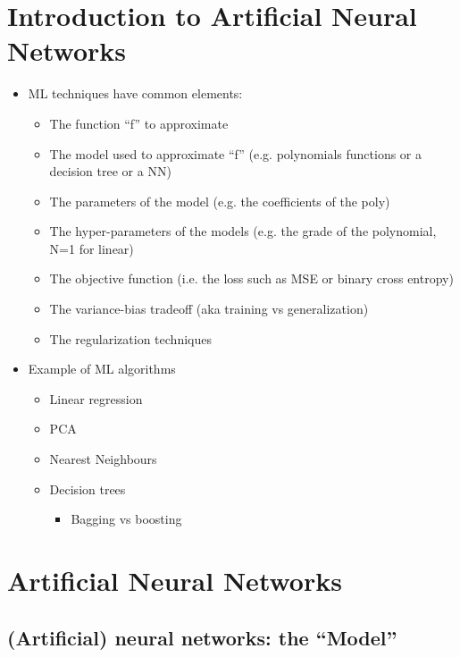\section{Introduction to Artificial Neural Networks}

\begin{tcolorbox}[width=\textwidth,colback={white},title={Recap lezione 1 },colbacktitle=cyan,coltitle=black]
	\begin{itemize}
		\item ML techniques have common elements:
		\begin{itemize}
			\item The function “f” to approximate
			\item The model used to approximate “f” (e.g. polynomials functions or a decision tree or a NN)
			\item The parameters of the model (e.g. the coefficients of the poly) 
			\item The hyper-parameters of the models (e.g. the grade of the polynomial, N=1 for linear)
			\item The objective function (i.e. the loss such as MSE or binary cross entropy)
			\item The variance-bias tradeoff (aka training vs generalization)
			\item The regularization techniques
		\end{itemize}
		\item Example of ML algorithms
		\begin{itemize}
			\item Linear regression
			\item PCA
			\item Nearest Neighbours
			\item Decision trees
			\begin{itemize}
				\item Bagging vs boosting
			\end{itemize}
		\end{itemize}
	\end{itemize} 
\end{tcolorbox}

\section{Artificial Neural Networks}
\subsection{(Artificial) neural networks: the “Model”}


